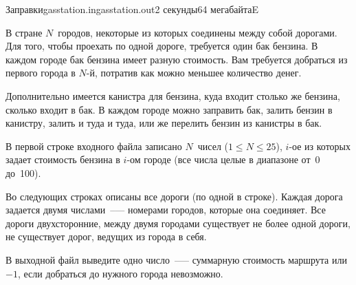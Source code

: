 \documentclass[12pt,a4paper,oneside,twocolumn,landscape]{article}
\renewcommand{\le}{\leqslant}
\begin{document}
\bigskip\bigskip
\begin{problem}{Заправки}{gasstation.in}{gasstation.out}{2 секунды}{64 мегабайта}{E}

В стране $N$~городов, некоторые из которых соединены между собой дорогами. 
Для того, чтобы проехать по одной дороге, требуется один бак бензина. 
В каждом городе бак бензина имеет разную стоимость. Вам требуется добраться 
из первого города в $N$-й, потратив как можно меньшее количество денег.



Дополнительно имеется канистра для бензина, куда входит столько же бензина,
сколько входит в бак. В каждом городе можно заправить бак, залить 
бензин в канистру, залить и туда и туда, или же перелить бензин 
из канистры в бак.

\InputFile
В первой строке входного файла записано $N$~чисел ($1\le N\le 25$), 
$i$-ое из которых задает стоимость бензина в $i$-ом городе 
(все числа целые в диапазоне от~0 до~100). 

Во следующих строках описаны все дороги (по одной в строке).
Каждая дорога задается двумя числами~--— номерами городов, 
которые она соединяет. Все дороги двухсторонние, между двумя городами
существует не более одной дороги, не существует дорог, ведущих 
из города в себя.

\OutputFile
В выходной файл выведите одно число~--— суммарную стоимость маршрута 
или $-1$, если добраться до нужного города невозможно.

\Example

\begin{example}
%
\end{example}


\end{problem}
\end{document}
